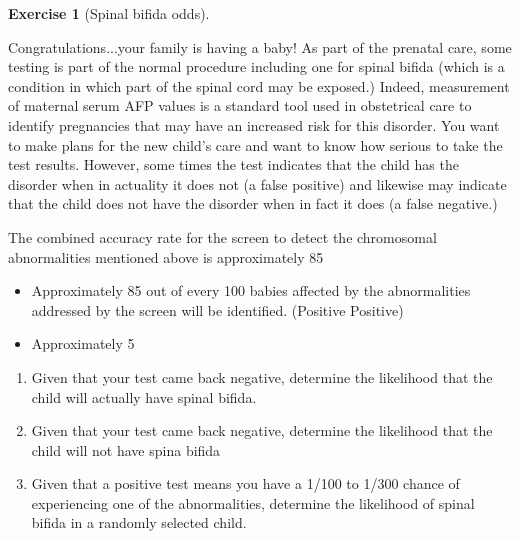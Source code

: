 \documentclass[10pt,]{book}
\theoremstyle{plain}
\theoremstyle{definition}
\theoremstyle{definition}
\theoremstyle{definition}
\newtheorem{exercise}[theorem]{Exercise}
\numberwithin{equation}{section}
\begin{document}
\begin{exercise}[{Spinal bifida odds}]\label{exercise-33}

	Congratulations...your family is having a baby! As part of the prenatal care, some testing is part of the normal procedure including one for spinal bifida (which is a condition in which part of the spinal cord may be exposed.) Indeed, measurement of maternal serum AFP values is a standard tool used in obstetrical care to identify pregnancies that may have an increased risk for this disorder. You want to make plans for the new child's care and want to know how serious to take the test results. However, some times the test indicates that the child has the disorder when in actuality it does not (a false positive) and likewise may indicate that the child does not have the disorder when in fact it does (a false negative.) 
\par
The combined accuracy rate for the screen to detect the chromosomal abnormalities mentioned above is approximately 85%
	\leavevmode%
\begin{itemize}[label=\textbullet]
\item{}Approximately 85 out of every 100 babies affected by the abnormalities addressed by the screen will be identified. (Positive Positive)%
\item{}Approximately 5%
\end{itemize}

	\leavevmode%
\begin{enumerate}
\item\hypertarget{li-172}{}Given that your test came back negative, determine the likelihood that the child will actually have spinal bifida.%
\item\hypertarget{li-173}{}Given that your test came back negative, determine the likelihood that the child will not have spina bifida%
\item\hypertarget{li-174}{}Given that a positive test means you have a 1/100 to 1/300 chance of experiencing one of the abnormalities, determine the likelihood of spinal bifida in a randomly selected child.%
\end{enumerate}

\end{exercise}
\typeout{************************************************}
\typeout{************************************************}
\end{document}
